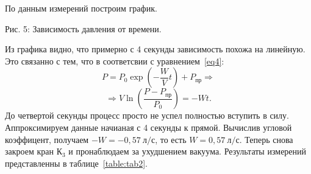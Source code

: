 \documentclass[a4paper,11pt]{article}
\begin{document}
По данным измерений построим график.
\begin{center}
\newline
Рис. 5: Зависимость давления от времени.
\end{center}
Из графика видно, что примерно с 4 секунды зависимость похожа на линейную. Это связанно с тем, что в соответсвии с уравнением~\ref{eq4}:
$$P = P_{0} \exp \left(-\frac{W}{V} t\right) + P_{пр} \Rightarrow$$
$$\Rightarrow V \ln \left(\frac{P - P_{пр}}{P_{0}}\right) = -Wt.$$
До четвертой секунды процесс просто не успел полностью вступить в силу.
Аппроксимируем данные начианая с 4 секунды к прямой. Вычислив угловой
коэффицент, получаем $-W = -0,57\ л/с$, то есть $W = 0,57\ л/с$.
Теперь снова закроем кран $К_{3}$ и пронаблюдаем за ухудшением вакуума. Результаты измерений представленны в таблице~\ref{table:tab2}.
\end{document}
